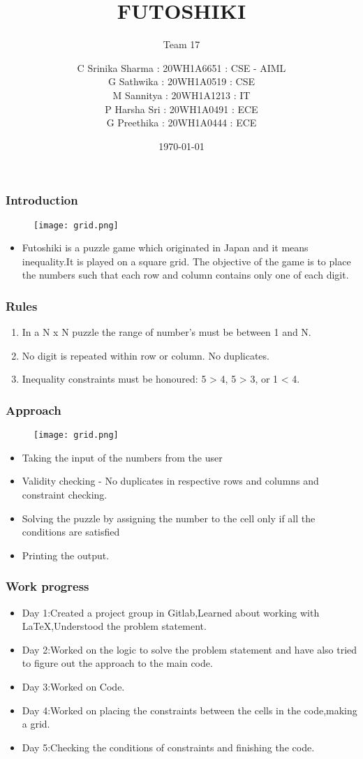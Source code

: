 \documentclass[14pt]{beamer}
\title{FUTOSHIKI}
\subtitle{Team 17}
\date{\today}
\author[Bvrith]{ C Srinika Sharma : 20WH1A6651 : CSE - AIML\\G Sathwika : 20WH1A0519 : CSE\\M Sannitya : 20WH1A1213 : IT \\P Harsha Sri : 20WH1A0491 : ECE\\G Preethika : 20WH1A0444 : ECE}
\begin{document}
   \begin{frame}
        \titlepage
    \end{frame}
   \begin{frame}
	\frametitle{Introduction}
        \begin{figure}
            \texttt{[image: grid.png]}
        \end{figure}
        \begin{itemize}
	    \item Futoshiki is a puzzle game which originated in Japan and it means inequality.It is played on a square grid. The objective of the game is to place the numbers such that each row and column contains only one of each digit.
	\end{itemize}
   \end{frame}
   \begin{frame}
	\frametitle{Rules}
         \begin{enumerate}
	    \item In a N x N puzzle the range of number's must be between 1 and N.  
	    \item No digit is repeated within row or column. No duplicates. 
	    \item Inequality constraints must be honoured: 5 > 4, 5 > 3, or 1 < 4.
	\end{enumerate}
  \end{frame}
\begin{frame}
   \frametitle{Approach}
    \begin{figure}
            \texttt{[image: grid.png]}
    \end{figure}
   \begin{itemize}
       \item Taking the input of the numbers from the user
       \item Validity checking - No duplicates in respective rows and columns and constraint checking.
       \item Solving the puzzle by assigning the number to the cell only if all the conditions are satisfied
       \item Printing the output.
   \end{itemize}
\end{frame}
\begin{frame}
     \frametitle{Work progress}
     \begin{itemize}
         \item Day 1:Created a project group in Gitlab,Learned about working with LaTeX,Understood the problem statement. 
         \item Day 2:Worked on the logic to solve the problem statement and have also tried to figure out the approach to the main code.
         \item Day 3:Worked on Code.
         \item Day 4:Worked on placing the constraints between the cells in the code,making a grid.
         \item Day 5:Checking the conditions of constraints and finishing the code.
     \end{itemize}
\end{frame}
\end{document}
